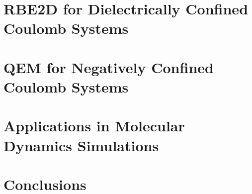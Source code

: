 \documentclass[a4paper]{ustthesis}
\begin{document}
\chapter{RBE2D for Dielectrically Confined Coulomb Systems}
\label{chp_rbe2d}

\newpage

\chapter{QEM for Negatively Confined Coulomb Systems}
\label{chp_quasiewald}

\newpage

\chapter{Applications in Molecular Dynamics Simulations}
\label{chp_applications}

\newpage

\chapter{Conclusions}
\label{chp_conclusion}

\newpage


\end{document}
